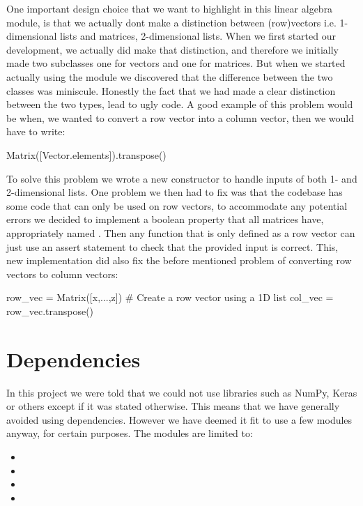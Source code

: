 \documentclass[a4paper,oneside,article,english]{memoir}
\begin{document}
One important design choice that we want to highlight in this linear algebra
module, is that we actually dont make a distinction between (row)vectors i.e.
1-dimensional lists and matrices, 2-dimensional lists. When we first started our
development, we actually did make that distinction, and therefore we initially
made two subclasses one for vectors and one for matrices. But when we started
actually using the module we discovered that the difference between the two
classes was miniscule. Honestly the fact that we had made a clear distinction
between the two types, lead to ugly code. A good example of this problem would
be when, we wanted to convert a row vector into a column vector, then we would
have to write:
\begin{python}
Matrix([Vector.elements]).transpose()
\end{python}
To solve this problem we wrote a new 
constructor to handle inputs of both 1- and 2-dimensional lists. One problem we
then had to fix was that the codebase has some code that can only be used on row
vectors, to accommodate any potential errors we decided to implement a boolean
property that all matrices have, appropriately named
. Then any function that is only defined as
a row vector can just use an assert statement to check that the provided
 input is correct. This, new implementation did also fix
the before mentioned problem of converting row vectors to column vectors:
\begin{python}
row_vec = Matrix([x,...,z]) # Create a row vector using a 1D list 
col_vec = row_vec.transpose() 
\end{python}



\section{Dependencies}  
\label{sec:dependencies}
In this project we were told that we could not use libraries such as NumPy, Keras or others except if it was stated otherwise. This means that we have generally avoided using dependencies. However we have deemed it fit to use a few modules anyway, for certain purposes. The modules are limited to: 
\begin{itemize}
    \item {}
    \item {}
    \item {}
    \item {}
\end{itemize}
\end{document}
